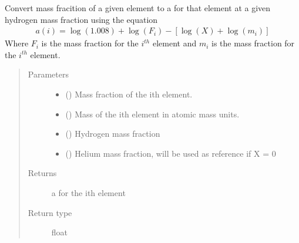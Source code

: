 \documentclass[letterpaper,10pt,english]{sphinxmanual}
\begin{document}

\begin{fulllineitems}
\label{\detokenize{pyTOPSScrape.parse:pyTOPSScrape.parse.abundance.mfrac_to_a}}
\sphinxAtStartPar
Convert mass fracition of a given element to a for that element at a given
hydrogen mass fraction using the equation
\begin{equation*}
\begin{split}a(i) = \log(1.008) + \log(F_{i}) - \left[\log(X) + \log(m_{i}) \right]\end{split}
\end{equation*}
\sphinxAtStartPar
Where \(F_{i}\) is the mass fraction for the \(i^{th}\) element and
\(m_{i}\) is the mass fraction for the \(i^{th}\) element.
\begin{quote}\begin{description}
\item[{Parameters}] \leavevmode\begin{itemize}
\item {} 
\sphinxAtStartPar
{} () \textendash{} Mass fraction of the ith element.

\item {} 
\sphinxAtStartPar
{} () \textendash{} Mass of the ith element in atomic mass units.

\item {} 
\sphinxAtStartPar
{} () \textendash{} Hydrogen mass fraction

\item {} 
\sphinxAtStartPar
{} () \textendash{} Helium mass fraction, will be used as reference if X = 0

\end{itemize}

\item[{Returns}] \leavevmode
\sphinxAtStartPar
{} \textendash{} a for the ith element

\item[{Return type}] \leavevmode
\sphinxAtStartPar
float

\end{description}\end{quote}

\end{fulllineitems}
\end{document}

